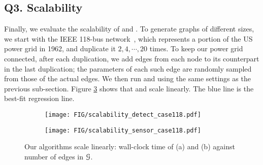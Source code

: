 \subsection{Q3. Scalability}
Finally, we evaluate the scalability of \methodD and \method. To generate graphs of different sizes, we start with the IEEE 118-bus network~\cite{118bus}, which represents a portion of the US power grid in 1962, and duplicate it $2, 4, \cdots, 20$ times. To keep our power grid connected, after each duplication, we add edges from each node to its counterpart in the last duplication; the parameters of each such edge are randomly sampled from those of the actual edges. We then run \methodD and \method using the same settings as the previous sub-section. Figure \ref{fig:scalability_case118} shows that \methodD and \method scale linearly. The blue line is the best-fit regression line. 
\begin{figure}[htb]
\centering
\begin{subfigure}[t]{0.3\textwidth}
    \texttt{[image: FIG/scalability\_detect\_case118.pdf]}
    \caption{\label{fig:scalability_case118} \methodD}
\end{subfigure} 
\hspace{.5cm}
\begin{subfigure}[t]{0.3\textwidth}
    \texttt{[image: FIG/scalability\_sensor\_case118.pdf]}
    \caption{\label{fig:scalability_case118} \method}
\end{subfigure} 
\caption{ Our algorithms scale linearly: wall-clock time of (a) \methodD and (b) \method against number of edges in $\mathcal{G}$.}
\end{figure}